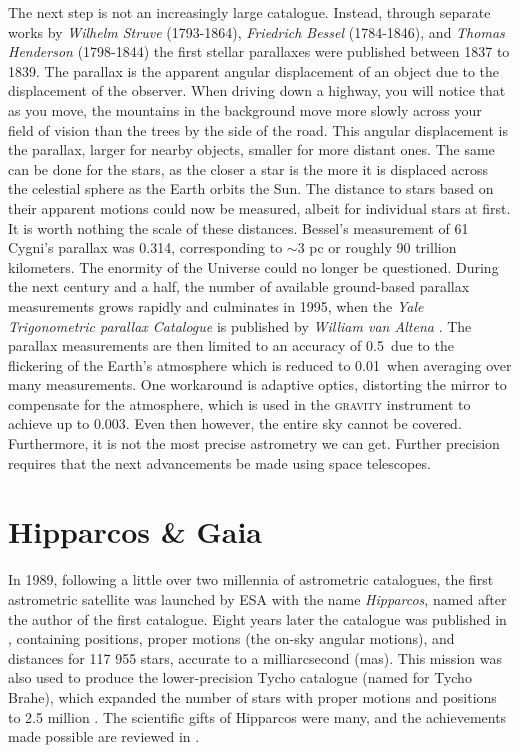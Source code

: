 The next step is not an increasingly large catalogue. Instead, through separate works by \textit{Wilhelm Struve} (1793-1864), \textit{Friedrich Bessel} (1784-1846), and \textit{Thomas Henderson} (1798-1844) the first stellar parallaxes were published between 1837 to 1839. The parallax is the apparent angular displacement of an object due to the displacement of the observer. When driving down a highway, you will notice that as you move, the mountains in the background move more slowly across your field of vision than the trees by the side of the road. This angular displacement is the parallax, larger for nearby objects, smaller for more distant ones. The same can be done for the stars, as the closer a star is the more it is displaced across the celestial sphere as the Earth orbits the Sun. The distance to stars based on their apparent motions could now be measured, albeit for individual stars at first. It is worth nothing the scale of these distances. Bessel's measurement of 61 Cygni's parallax was 0.314\as, corresponding to ${\sim}3$ pc or roughly 90 trillion kilometers. The enormity of the Universe could no longer be questioned. During the next century and a half, the number of available ground-based parallax measurements grows rapidly and culminates in 1995, when the \textit{Yale Trigonometric parallax Catalogue} is published by \textit{William van Altena} \citep{vanaltena:95}. The parallax measurements are then limited to an accuracy of 0.5\as\ due to the flickering of the Earth's atmosphere which is reduced to 0.01\as\ when averaging over many measurements. One workaround is adaptive optics, distorting the mirror to compensate for the atmosphere, which is used in the \textsc{gravity} instrument \citep{gravity:11} to achieve up to 0.003\as. Even then however, the entire sky cannot be covered. Furthermore, it is not the most precise astrometry we can get. Further precision requires that the next advancements be made using space telescopes.

\section{Hipparcos \& Gaia}\label{sec:gaia}
In 1989, following a little over two millennia of astrometric catalogues, the first astrometric satellite was launched by ESA with the name \textit{Hipparcos}, named after the author of the first catalogue. Eight years later the catalogue was published in \cite{perryman:97}, containing positions, proper motions (the on-sky angular motions), and distances for 117 955 stars, accurate to a milliarcsecond (mas). This mission was also used to produce the lower-precision Tycho catalogue (named for Tycho Brahe), which expanded the number of stars with proper motions and positions to 2.5 million \citep{hog:00}. The scientific gifts of Hipparcos were many, and the achievements made possible are reviewed in \cite{perryman:09}. 

